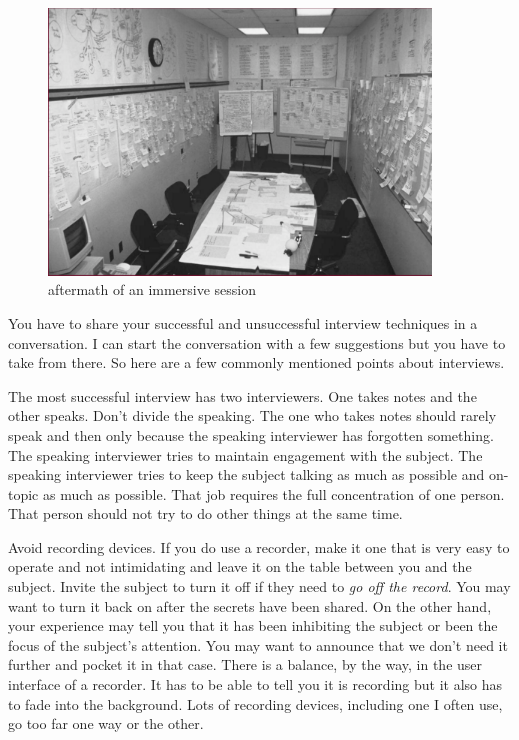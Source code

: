 \begin{figure}[htbp]
\begin{center}
  \includegraphics[width=4.0in]{fiAffinity.pdf}
\caption{aftermath of an immersive session}
\label{fig:fiAffinity.pdf}
\end{center}
\end{figure}

\hypertarget{share-interview-techniques}{%
\label{share-interview-techniques}}

You have to share your successful and unsuccessful interview techniques
in a conversation. I can start the conversation with a few suggestions
but you have to take from there. So here are a few commonly mentioned
points about interviews.

The most successful interview has two interviewers. One takes notes and
the other speaks. Don't divide the speaking. The one who takes notes
should rarely speak and then only because the speaking interviewer has
forgotten something. The speaking interviewer tries to maintain
engagement with the subject. The speaking interviewer tries to keep the
subject talking as much as possible and on-topic as much as possible.
That job requires the full concentration of one person. That person
should not try to do other things at the same time.

Avoid recording devices. If you do use a recorder, make it one that is
very easy to operate and not intimidating and leave it on the table
between you and the subject. Invite the subject to turn it off if they
need to \emph{go off the record}. You may want to turn it back on after
the secrets have been shared. On the other hand, your experience may
tell you that it has been inhibiting the subject or been the focus of
the subject's attention. You may want to announce that we don't need it
further and pocket it in that case. There is a balance, by the way, in
the user interface of a recorder. It has to be able to tell you it is
recording but it also has to fade into the background. Lots of recording
devices, including one I often use, go too far one way or the other.


